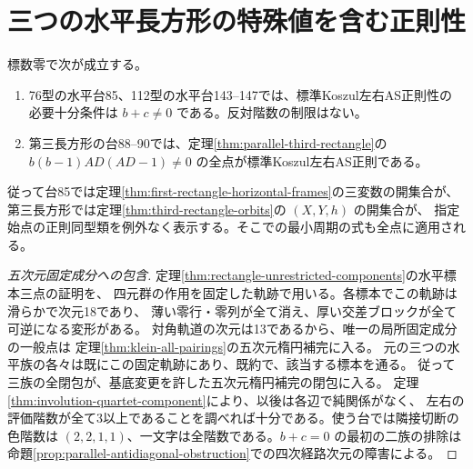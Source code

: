 \section{三つの水平長方形の特殊値を含む正則性}
\label{sec:horizontal-rectangle-flags}
\begin{theorem}\label{thm:horizontal-rectangle-flags}
標数零で次が成立する。
\begin{enumerate}
\item 76型の水平台85、112型の水平台143--147では、標準Koszul左右AS正則性の
必要十分条件は $b+c\ne0$ である。反対階数の制限はない。
\item 第三長方形の台88--90では、定理\ref{thm:parallel-third-rectangle}の
$b(b-1)AD(AD-1)\ne0$ の全点が標準Koszul左右AS正則である。
\end{enumerate}
従って台85では定理\ref{thm:first-rectangle-horizontal-frames}の三変数の開集合が、
第三長方形では定理\ref{thm:third-rectangle-orbits}の $(X,Y,h)$ の開集合が、
指定始点の正則同型類を例外なく表示する。そこでの最小周期の式も全点に適用される。
\end{theorem}

\begin{proof}[五次元固定成分への包含]
定理\ref{thm:rectangle-unrestricted-components}の水平標本三点の証明を、
四元群の作用を固定した軌跡で用いる。各標本でこの軌跡は滑らかで次元18であり、
薄い零行・零列が全て消え、厚い交差ブロックが全て可逆になる変形がある。
対角軌道の次元は13であるから、唯一の局所固定成分の一般点は
定理\ref{thm:klein-all-pairings}の五次元楕円補完に入る。
元の三つの水平族の各々は既にこの固定軌跡にあり、既約で、該当する標本を通る。
従って三族の全閉包が、基底変更を許した五次元楕円補完の閉包に入る。
定理\ref{thm:involution-quartet-component}により、以後は各辺で純関係がなく、
左右の評価階数が全て3以上であることを調べれば十分である。使う台では隣接切断の色階数は
$(2,2,1,1)$、一文字は全階数である。$b+c=0$ の最初の二族の排除は
命題\ref{prop:parallel-antidiagonal-obstruction}での四次経路次元の障害による。
\end{proof}

